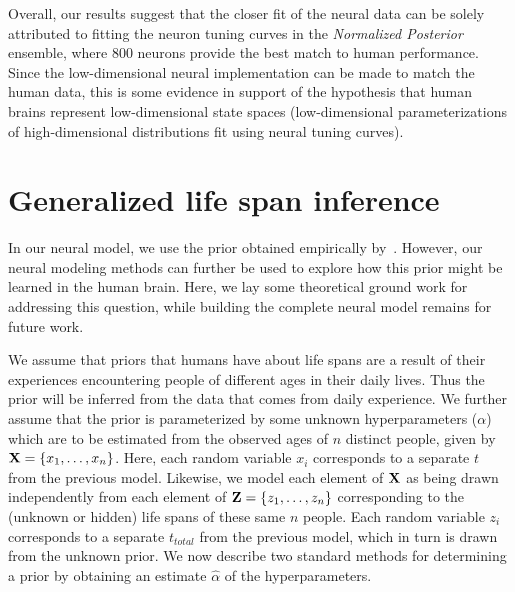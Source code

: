 \documentclass[10pt,letterpaper]{article}
\renewcommand{\vec}[1]{{\bf {#1}}}
\begin{document}
Overall, our results suggest that the closer fit of the neural data can be solely attributed to fitting the neuron tuning curves in the \textit{Normalized Posterior} ensemble, where 800 neurons provide the best match to human performance. Since the low-dimensional neural implementation can be made to match the human data, this is some evidence in support of the hypothesis that human brains represent low-dimensional state spaces (low-dimensional parameterizations of high-dimensional distributions fit using neural tuning curves).

\section{Generalized life span inference}

In our neural model, we use the prior obtained empirically by~. However, our neural modeling methods can further be used to explore how this prior might be learned in the human brain. Here, we lay some theoretical ground work for addressing this question, while building the complete neural model remains for future work.

We assume that priors that humans have about life spans are a result of their experiences encountering people of different ages in their daily lives. Thus the prior will be inferred from the data that comes from daily experience. We further assume that the prior is parameterized by some unknown hyperparameters ($\alpha$) which are to be estimated from the observed ages of $n$ distinct people, given by $\vec{X} = \{x_1, \ldots, x_n\}$. Here, each random variable $x_i$ corresponds to a separate $t$ from the previous model. Likewise, we model each element of $\vec{X}$ as being drawn independently from each element of $\vec{Z} = \{z_1, \ldots, z_n\}$ corresponding to the (unknown or hidden) life spans of these same $n$ people. Each random variable $z_i$ corresponds to a separate $t_{total}$ from the previous model, which in turn is drawn from the unknown prior. We now describe two standard methods for determining a prior by obtaining an estimate $\hat{\alpha}$ of the hyperparameters.
\end{document}
